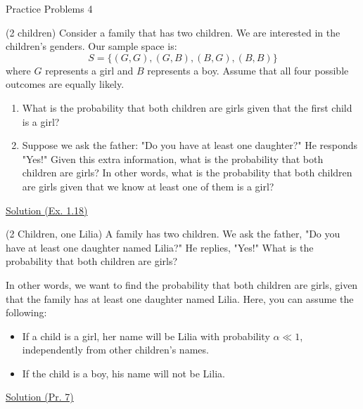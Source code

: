 

\begin{center}\begin{large} Practice Problems 4
 \end{large}\end{center}
 \bigskip


\tableofcontents 
 
\begin{problem} (2 children)
    Consider a family that has two children. We are interested in the children's genders. Our sample space is:
    \[
    S = \{(G, G), (G, B), (B, G), (B, B)\}
    \]
    where \( G \) represents a girl and \( B \) represents a boy. Assume that all four possible outcomes are equally likely.
    
    \begin{enumerate}
        \item What is the probability that both children are girls given that the first child is a girl?
        
        \item Suppose we ask the father: "Do you have at least one daughter?" He responds "Yes!" Given this extra information, what is the probability that both children are girls? In other words, what is the probability that both children are girls given that we know at least one of them is a girl?
    \end{enumerate}
    \href{https://www.probabilitycourse.com/chapter1/1_4_0_conditional_probability.php#example18}{Solution (Ex. 1.18)}

\end{problem}  




\begin{problem} (2 Children, one Lilia) 
    A family has two children. We ask the father, "Do you have at least one daughter named Lilia?" He replies, "Yes!" What is the probability that both children are girls? 

    In other words, we want to find the probability that both children are girls, given that the family has at least one daughter named Lilia. Here, you can assume the following:
    \begin{itemize}
        \item If a child is a girl, her name will be Lilia with probability \( \alpha \ll 1 \), independently from other children's names.
        \item If the child is a boy, his name will not be Lilia.
    \end{itemize}
\end{problem}
\href{https://www.probabilitycourse.com/chapter1/1_4_5_solved3.php}{Solution (Pr. 7)}

